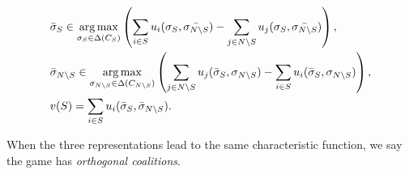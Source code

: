 \begin{description}
	\begin{align}
 &	\bar{\sigma}_S \in \operatorname*{arg\,max}_{\sigma_S \in \Delta(C_S)} \left ( \sum_{i \in S} u_i (\sigma_S, \bar{\sigma_{N \backslash S}}) -  \sum_{j \in N\backslash S} u_j (\sigma_S, \bar{\sigma_{N \backslash S}})  \right ), \label{eq1RT}\\
 &	\bar{\sigma}_{N \backslash S} \in \operatorname*{arg\,max}_{\sigma_{N \backslash S} \in \Delta(C_{N \backslash S})} \left ( \sum_{j \in {N \backslash S}} u_j (\bar{\sigma}_S, {\sigma_{N \backslash S}}) -  \sum_{i \in S} u_i (\bar{\sigma}_S, {\sigma_{N \backslash S}})  \right ), \label{eq2RT} \\
 & v(S) = \sum_{i \in S} u_i(\bar{\sigma}_S, \bar{\sigma}_{N \backslash S}).
	\end{align}

\end{description}
When the three representations lead to the same characteristic function, we say the game has \emph{orthogonal coalitions}.
